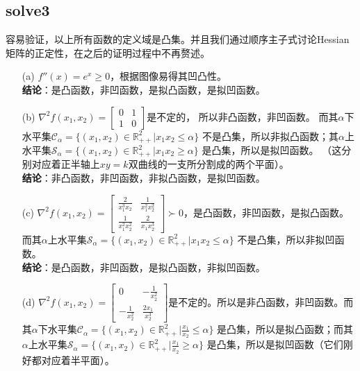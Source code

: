 \documentclass[12pt,a4paper]{ctexart}
\begin{document}
\subsection*{solve3}
容易验证，以上所有函数的定义域是凸集。并且我们通过顺序主子式讨论Hessian矩阵的正定性，在之后的证明过程中不再赘述。
\begin{itemize}
    \item[(a)] $f''(x)=e^x \geq 0$，根据图像易得其凹凸性。\\
    \textbf{结论}：是凸函数，非凹函数，是拟凸函数，是拟凹函数。
    \item[(b)] $\nabla^2f(x_1,x_2)=
    \begin{bmatrix}
        0 & 1 \\
        1 & 0
    \end{bmatrix} 
     $是不定的， 所以非凸函数，非凹函数。
    而其$\alpha$下水平集$\mathcal{C}_{\alpha}=\{(x_1,x_2) \in \mathbb{R}^2_{++} | x_1x_2\leq \alpha\}$
    不是凸集，所以非拟凸函数；其$\alpha$上水平集$\mathcal{S}_{\alpha}=\{(x_1,x_2) \in \mathbb{R}^2_{++} | x_1x_2\geq \alpha\}$
    是凸集，所以是拟凹函数。
    （这分别对应着正半轴上$xy=k$双曲线的一支所分割成的两个平面）。\\
    \textbf{结论}：非凸函数，非凹函数，非拟凸函数，是拟凹函数。
    \item[(c)] $\nabla^2f(x_1,x_2)=
    \begin{bmatrix}
        \frac{2}{x_1^3x_2} & \frac{1}{x_1^2x_2^2} \\
        \frac{1}{x_1^2x_2^2} & \frac{2}{x_1x_2^3}
    \end{bmatrix} \succ 0
    $，是凸函数，非凹函数，是拟凸函数。而其$\alpha$上水平集$\mathcal{S}_{\alpha}=\{(x_1,x_2) \in \mathbb{R}^2_{++} | x_1x_2\leq \alpha\}$
    不是凸集，所以非拟凹函数。\\
    \textbf{结论}：是凸函数，非凹函数，是拟凸函数，非拟凹函数。
    \item[(d)] $\nabla^2f(x_1,x_2)=
    \begin{bmatrix}
        0 & -\frac{1}{x_2^2} \\
        -\frac{1}{x_2^2} & \frac{2x_1}{x_2^3}
    \end{bmatrix} 
    $是不定的。所以是非凸函数，非凹函数。而其$\alpha$下水平集$\mathcal{C}_{\alpha}=\{(x_1,x_2) \in \mathbb{R}^2_{++} | \frac{x_1}{x_2}\leq \alpha\}$
    是凸集，所以是拟凸函数；而其$\alpha$上水平集$\mathcal{S}_{\alpha}=\{(x_1,x_2) \in \mathbb{R}^2_{++} | \frac{x_1}{x_2}\geq \alpha\}$
    是凸集，所以是拟凹函数（它们刚好都对应着半平面）。\\

\end{itemize}
\end{document}
